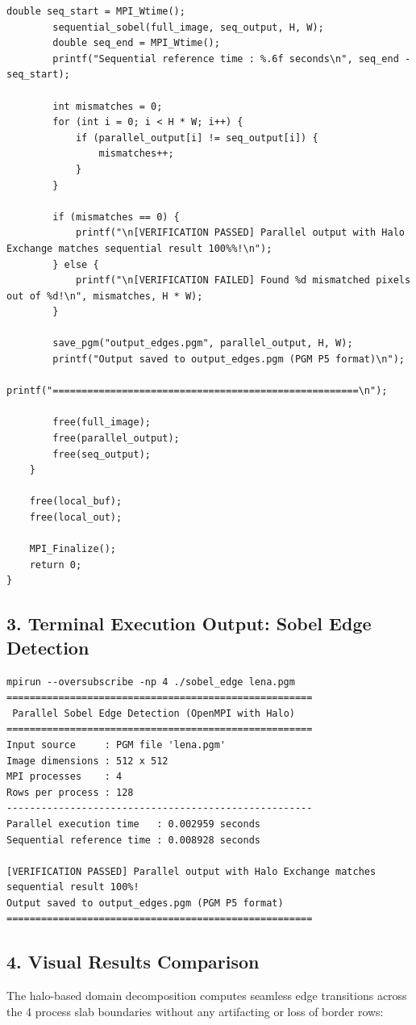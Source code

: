 \documentclass[12pt]{article}
\begin{document}
\begin{lstlisting}[style=code]
        double seq_start = MPI_Wtime();
        sequential_sobel(full_image, seq_output, H, W);
        double seq_end = MPI_Wtime();
        printf("Sequential reference time : %.6f seconds\n", seq_end - seq_start);

        int mismatches = 0;
        for (int i = 0; i < H * W; i++) {
            if (parallel_output[i] != seq_output[i]) {
                mismatches++;
            }
        }

        if (mismatches == 0) {
            printf("\n[VERIFICATION PASSED] Parallel output with Halo Exchange matches sequential result 100%%!\n");
        } else {
            printf("\n[VERIFICATION FAILED] Found %d mismatched pixels out of %d!\n", mismatches, H * W);
        }

        save_pgm("output_edges.pgm", parallel_output, H, W);
        printf("Output saved to output_edges.pgm (PGM P5 format)\n");
        printf("=====================================================\n");

        free(full_image);
        free(parallel_output);
        free(seq_output);
    }

    free(local_buf);
    free(local_out);

    MPI_Finalize();
    return 0;
}
\end{lstlisting}

\subsection*{3. Terminal Execution Output: Sobel Edge Detection}
\begin{lstlisting}[style=output]
mpirun --oversubscribe -np 4 ./sobel_edge lena.pgm
=====================================================
 Parallel Sobel Edge Detection (OpenMPI with Halo)  
=====================================================
Input source     : PGM file 'lena.pgm'
Image dimensions : 512 x 512
MPI processes    : 4
Rows per process : 128
-----------------------------------------------------
Parallel execution time   : 0.002959 seconds
Sequential reference time : 0.008928 seconds

[VERIFICATION PASSED] Parallel output with Halo Exchange matches sequential result 100%!
Output saved to output_edges.pgm (PGM P5 format)
=====================================================
\end{lstlisting}

\subsection*{4. Visual Results Comparison}
The halo-based domain decomposition computes seamless edge transitions across the 4 process slab boundaries without any artifacting or loss of border rows:
\end{document}
